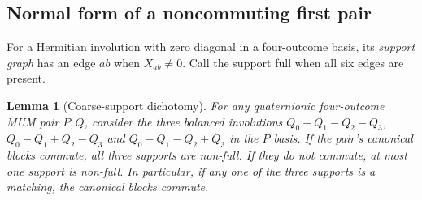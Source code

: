 \documentclass[11pt]{article}
\newtheorem{lemma}[theorem]{Lemma}
\begin{document}
\subsection{Normal form of a noncommuting first pair}
For a Hermitian involution with zero diagonal in a four-outcome basis,
its \emph{support graph} has an edge $ab$ when $X_{ab}\ne0$.
Call the support full when all six edges are present.
\begin{lemma}[Coarse-support dichotomy]\label{lem:coarsesupport}
For any quaternionic four-outcome MUM pair $P,Q$, consider the three
balanced involutions
$Q_0+Q_1-Q_2-Q_3$, $Q_0-Q_1+Q_2-Q_3$ and
$Q_0-Q_1-Q_2+Q_3$ in the $P$ basis.
If the pair's canonical blocks commute, all three supports are non-full.
If they do not commute, at most one support is non-full.
In particular, if any one of the three supports is a matching, the
canonical blocks commute.
\end{lemma}
\end{document}
